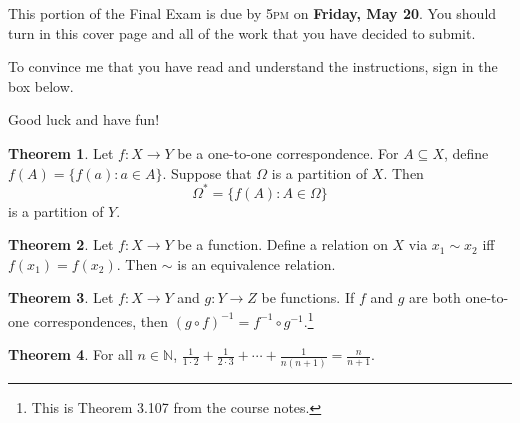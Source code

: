 \documentclass[11pt]{article}
\theoremstyle{definition}
\newtheorem{theorem}{Theorem}
\begin{document}
This portion of the Final Exam is due by 5\textsc{pm} on \textbf{Friday, May 20}.  You should turn in this cover page and all of the work that you have decided to submit.

\bigskip

To convince me that you have read and understand the instructions, sign in the box below.

\bigskip


\bigskip

Good luck and have fun!

\newpage

\begin{theorem}
Let $f:X\to Y$ be a one-to-one correspondence.  For $A\subseteq X$, define $f(A)=\{f(a):a\in A\}$.  Suppose that $\Omega$ is a partition of $X$.  Then
\[
\Omega^{*}=\{f(A):A\in\Omega\}
\]
is a partition of $Y$.
\end{theorem}

\begin{theorem}
Let $f:X\to Y$ be a function.  Define a relation on $X$ via $x_{1}\sim x_{2}$ iff $f(x_{1})=f(x_{2})$.  Then $\sim$ is an equivalence relation.
\end{theorem}

\begin{theorem}
Let $f:X\to Y$ and $g:Y\to Z$ be functions.  If $f$ and $g$ are both one-to-one correspondences, then $(g\circ f)^{-1}=f^{-1}\circ g^{-1}$.\footnote{This is Theorem 3.107 from the course notes.}
\end{theorem}

\begin{theorem}
For all $n\in\mathbb{N}$, $\displaystyle \frac{1}{1\cdot 2}+\frac{1}{2\cdot 3}+\cdots +\frac{1}{n(n+1)}=\frac{n}{n+1}$.
\end{theorem}
\end{document}

